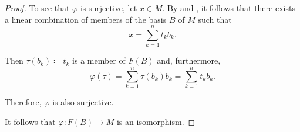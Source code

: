 \begin{proof}
  To see that \( \varphi \) is surjective, let \( x \in M \). By  and , it follows that there exists a linear combination of members of the basis \( B \) of \( M \) such that
  \begin{equation*}
    x = \sum_{k=1}^n t_k b_k.
  \end{equation*}

  Then \( \tau(b_k) \coloneqq t_k \) is a member of \( F(B) \) and, furthermore,
  \begin{equation*}
    \varphi(\tau) = \sum_{k=1}^n \tau(b_k) b_k = \sum_{k=1}^n t_k b_k.
  \end{equation*}

  Therefore, \( \varphi \) is also surjective.

  It follows that \( \varphi: F(B) \to M \) is an isomorphism.
\end{proof}

